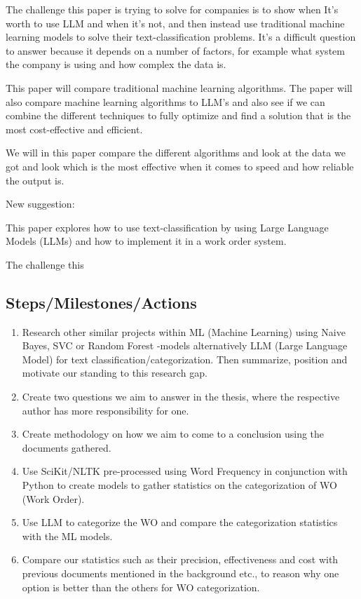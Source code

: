 \documentclass{article}
\begin{document}
The challenge this paper is trying to solve for companies is to show when It's worth to use LLM and when it's not, and
then instead use traditional machine learning models to solve their text-classification problems. It's a difficult question to answer
because it depends on a number of factors, for example what system the company is using and how complex the data is.

This paper will compare traditional machine learning algorithms. The paper will also compare machine learning algorithms
to LLM's and also see if we can combine the different techniques to fully optimize and find a solution that is the most cost-effective
and efficient.

We will in this paper compare the different algorithms and look at the data we got and look which is the most effective when it comes to speed
and how reliable the output is.


New suggestion:

This paper explores how to use text-classification by using Large Language Models (LLMs) and how to implement it in a work order system.

The challenge this 


\subsection{Steps/Milestones/Actions}

\begin{enumerate}
      \item Research other similar projects within ML (Machine Learning) using Naive Bayes,
            SVC or Random Forest -models alternatively LLM (Large Language Model) for text
            classification/categorization. Then summarize, position and motivate our standing to
            this research gap.
      \item Create two questions we aim to answer in the thesis, where the respective author
            has more responsibility for one.
      \item Create methodology on how we aim to come to a conclusion using the documents gathered.
      \item Use SciKit/NLTK pre-processed using Word Frequency in conjunction with Python
            to create models to gather statistics on the categorization of WO (Work Order).
      \item Use LLM to categorize the WO and compare the categorization statistics
            with the ML models.
      \item Compare our statistics such as their precision,
            effectiveness and cost with previous documents mentioned in the background etc.,
            to reason why one option is better than the others for WO categorization.
\end{enumerate}
\end{document}
